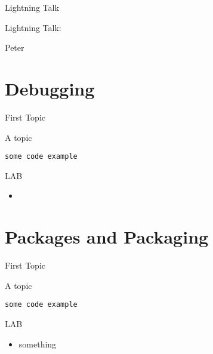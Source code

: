\documentclass{beamer}
\begin{document}
\begin{frame}{Lightning Talk}

{\centering

\vfill
{\LARGE Lightning Talk:  }

\vfill
{\Huge Peter}

\vfill
}
\end{frame}


\section{Debugging}

\begin{frame}[fragile]{First Topic}

 {\Large A topic}

\begin{verbatim}
some code example
\end{verbatim}

\end{frame} 

\begin{frame}{LAB}

\begin{itemize}
  \item
\end{itemize}

\end{frame}


\section{Packages and Packaging}

\begin{frame}[fragile]{First Topic}

 {\Large A topic}

\begin{verbatim}
some code example
\end{verbatim}

\end{frame} 

\begin{frame}{LAB}

\begin{itemize}
  \item something
\end{itemize}

\end{frame}
\end{document}
